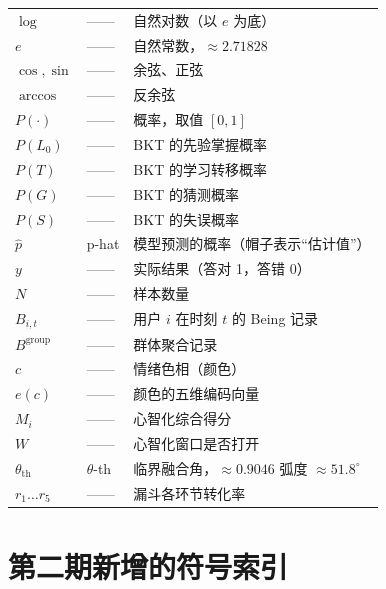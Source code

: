 \documentclass[UTF8,a4paper,11pt]{ctexart}
\begin{document}
\begin{longtable}{@{}p{2.3cm}p{2.1cm}p{9.9cm}@{}}
$\log$ & —— & 自然对数（以 $e$ 为底） \\
$e$ & —— & 自然常数，$\approx 2.71828$ \\
$\cos, \sin$ & —— & 余弦、正弦 \\
$\arccos$ & —— & 反余弦 \\
$P(\cdot)$ & —— & 概率，取值 $[0,1]$ \\
$P(L_0)$ & —— & BKT 的先验掌握概率 \\
$P(T)$ & —— & BKT 的学习转移概率 \\
$P(G)$ & —— & BKT 的猜测概率 \\
$P(S)$ & —— & BKT 的失误概率 \\
$\hat{p}$ & p-hat & 模型预测的概率（帽子表示“估计值”） \\
$y$ & —— & 实际结果（答对 1，答错 0） \\
$N$ & —— & 样本数量 \\
$B_{i,t}$ & —— & 用户 $i$ 在时刻 $t$ 的 Being 记录 \\
$B^{\text{group}}$ & —— & 群体聚合记录 \\
$c$ & —— & 情绪色相（颜色） \\
$e(c)$ & —— & 颜色的五维编码向量 \\
$M_i$ & —— & 心智化综合得分 \\
$W$ & —— & 心智化窗口是否打开 \\
$\theta_{\text{th}}$ & $\theta$-th & 临界融合角，$\approx 0.9046$ 弧度 $\approx 51.8^\circ$ \\
$r_1 \ldots r_5$ & —— & 漏斗各环节转化率 \\
\bottomrule
\end{longtable}

\newpage


\section{第二期新增的符号索引}
\end{document}
